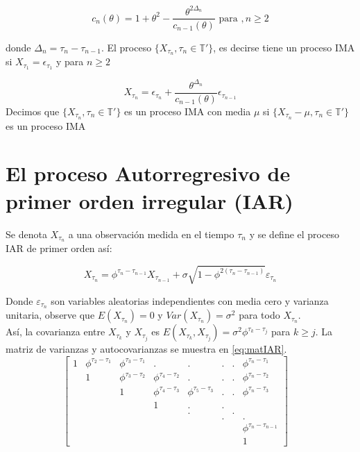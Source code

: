 $$
c_n(\theta)=1+\theta^2-\frac{\theta^{2\Delta_n}}{c_{n-1}(\theta)} \text{ para }, n\geq 2
$$

donde $\Delta_n=\tau_n-\tau_{n-1}$. El proceso $\lbrace X_{\tau_n},\tau_n \in \mathbb{T'} \rbrace$, es decirse tiene un proceso 
IMA si $X_{\tau_1}=\epsilon_{\tau_1}$ y para $n\geq 2 $

\begin{equation}
    X_{\tau_n}= \epsilon_{\tau_n}+\frac{\theta^{\Delta_n}}{c_{n-1}(\theta)}\epsilon_{\tau_{n-1}}
\end{equation}
Decimos que $\lbrace X_{\tau_n},\tau_n \in \mathbb{T'} \rbrace$ es un proceso IMA con media 
$\mu$ si $\lbrace X_{\tau_n}-\mu,\tau_n \in \mathbb{T'} \rbrace$ es un proceso IMA

\section{El proceso Autorregresivo de primer orden irregular (IAR)}
\label{sec:IAR}
Se denota $X_{\tau_n}$ a una observación medida en el tiempo $\tau_n$ y 
se define el proceso IAR de primer orden así:

\begin{equation}
	X_{\tau_n} = \phi^{\tau_n - \tau_{n-1}}X_{\tau_{n-1}} + \sigma \sqrt{1- \phi^{2(\tau_n - \tau_{n-1})} }\varepsilon_{\tau_n}
\label{eq:IAR}
\end{equation}

Donde $\varepsilon_{\tau_n}$ son variables aleatorias independientes con media cero
y varianza unitaria, observe que $E(X_{\tau_n}) = 0$ y $Var(X_{\tau_n}) = \sigma^2$ para 
todo $X_{\tau_n}$.\\

Así, la covarianza entre $X_{\tau_k}$ y $X_{\tau_j}$ es $E(X_{\tau_k} ,X_{\tau_j}) = \sigma^2\phi^{\tau_k - \tau_j}$
para $k \geq j$. La matriz de varianzas y autocovarianzas se muestra en  \ref{eq:matIAR}.\\

\begin{equation}
	\begin{bmatrix} 
	1 & \phi^{\tau_2 - \tau_1} & \phi^{\tau_3 - \tau_1} & .  & . &. &. & \phi^{\tau_n - \tau_1}  \\
	& 1 & \phi^{\tau_3 - \tau_2} & \phi^{\tau_4 - \tau_2}  & . & . & . & \phi^{\tau_n - \tau_2} \\
	&  & 1 & \phi^{\tau_4 - \tau_3}  & \phi^{\tau_5 - \tau_3} & . & . & \phi^{\tau_n - \tau_3} \\
	& & & 1& . & . \\
	& & & & .&  & .\\
	& & & & &. & & . \\
	& & & & & & & \phi^{\tau_n - \tau_{n-1}} \\
	& & & & & &  & 1 
	\end{bmatrix}
	\quad
	\label{eq:matIAR}
\end{equation}


